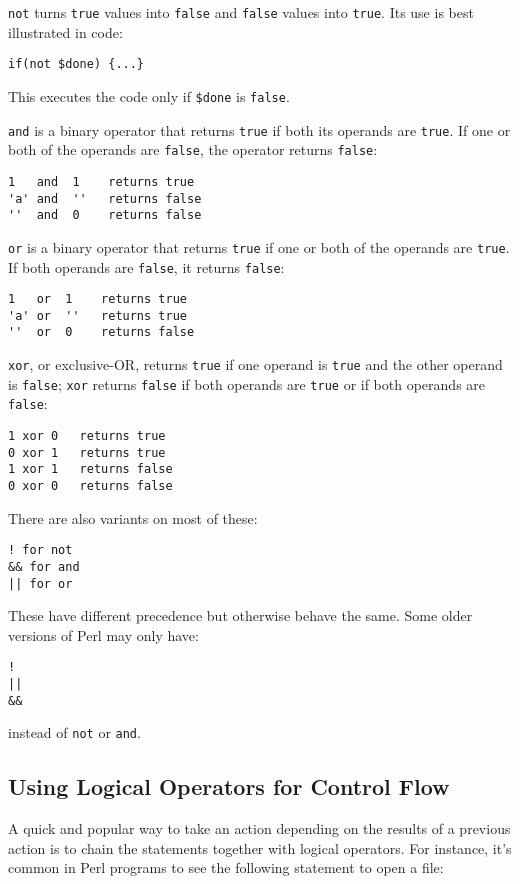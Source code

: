 \verb|not| turns \verb|true| values into \verb|false| and \verb|false| values into \verb|true|. Its use is best illustrated in code:

\begin{lstlisting}
if(not $done) {...}
\end{lstlisting}

This executes the code only if \verb|$done| is \verb|false|.

\verb|and| is a binary operator that returns \verb|true| if both its operands are \verb|true|. If one or both of the operands are \verb|false|, the operator returns \verb|false|:

\begin{lstlisting}
1   and  1    returns true
'a' and  ''   returns false
''  and  0    returns false
\end{lstlisting}

\verb|or| is a binary operator that returns \verb|true| if one or both of the operands are \verb|true|. If both operands are \verb|false|, it returns \verb|false|:

\begin{lstlisting}
1   or  1    returns true
'a' or  ''   returns true
''  or  0    returns false
\end{lstlisting}

\verb|xor|, or exclusive-OR, returns \verb|true| if one operand is \verb|true| and the other operand is \verb|false|; \verb|xor| returns \verb|false| if both operands are \verb|true| or if both operands are \verb|false|:

\begin{lstlisting}
1 xor 0   returns true
0 xor 1   returns true
1 xor 1   returns false
0 xor 0   returns false
\end{lstlisting}

There are also variants on most of these:

\begin{lstlisting}
! for not
&& for and
|| for or
\end{lstlisting}

These have different precedence but otherwise behave the same. Some older versions of Perl may only have:

\begin{lstlisting}
!
||
&&
\end{lstlisting}

instead of \verb|not| or \verb|and|.

\subsection{Using Logical Operators for Control Flow}
A quick and popular way to take an action depending on the results of a previous action is to chain the statements together with logical operators. For instance, it's common in Perl programs to see the following statement to open a file:

